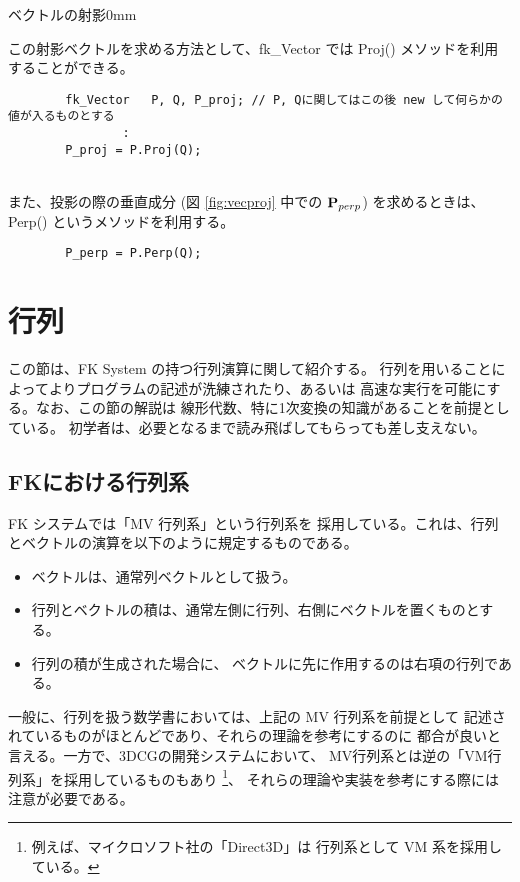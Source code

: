 	{ベクトルの射影}{0mm}

この射影ベクトルを求める方法として、fk\_Vector では
Proj() メソッドを利用することができる。
\\
\begin{screen}
\begin{verbatim}
        fk_Vector   P, Q, P_proj; // P, Qに関してはこの後 new して何らかの値が入るものとする
                :
        P_proj = P.Proj(Q);
\end{verbatim}
\end{screen}
~ \\	
また、投影の際の垂直成分 (図 \ref{fig:vecproj} 中での \(\mathbf{P}_{perp}\))
を求めるときは、Perp() というメソッドを利用する。
\\
\begin{screen}
\begin{verbatim}
        P_perp = P.Perp(Q);
\end{verbatim}
\end{screen}
\section{行列}
この節は、FK System の持つ行列演算に関して紹介する。
行列を用いることによってよりプログラムの記述が洗練されたり、あるいは
高速な実行を可能にする。なお、この節の解説は
線形代数、特に1次変換の知識があることを前提としている。
初学者は、必要となるまで読み飛ばしてもらっても差し支えない。

\subsection{FKにおける行列系}
FK システムでは「MV 行列系」という行列系を
採用している。これは、行列とベクトルの演算を以下のように規定するものである。
\begin{itemize}
 \item ベクトルは、通常列ベクトルとして扱う。
 \item 行列とベクトルの積は、通常左側に行列、右側にベクトルを置くものとする。
 \item 行列の積が生成された場合に、
	ベクトルに先に作用するのは右項の行列である。
\end{itemize}
一般に、行列を扱う数学書においては、上記の MV 行列系を前提として
記述されているものがほとんどであり、それらの理論を参考にするのに
都合が良いと言える。一方で、3DCGの開発システムにおいて、
MV行列系とは逆の「VM行列系」を採用しているものもあり
\footnote{例えば、マイクロソフト社の「Direct3D」は
行列系として VM 系を採用している。}、
それらの理論や実装を参考にする際には注意が必要である。

